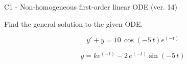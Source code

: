 \begin{exercise}
  \begin{exerciseTitle}C1 - Non-homogeneous first-order linear ODE (ver. 14)\end{exerciseTitle}
  \begin{exerciseStatement}
    
Find the general solution to the given ODE.

    
\[y'+y= 10 \, \cos\left(-5 \, t\right) e^{\left(-t\right)}\]

  \end{exerciseStatement}
  \begin{exerciseAnswer}
    
\[y= k e^{\left(-t\right)} - 2 \, e^{\left(-t\right)} \sin\left(-5 \, t\right)\]

  \end{exerciseAnswer}
\end{exercise}